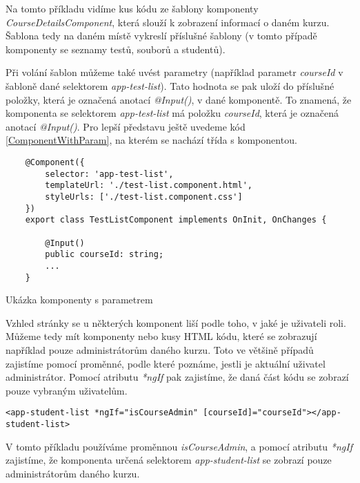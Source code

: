 Na tomto příkladu vidíme kus kódu ze šablony komponenty \textit{CourseDetailsComponent}, která slouží k zobrazení informací o daném kurzu. Šablona tedy na daném místě vykreslí příslušné šablony (v tomto případě komponenty se seznamy testů, souborů a studentů).

Při volání šablon můžeme také uvést parametry (například parametr \textit{courseId} v šabloně dané selektorem \textit{app-test-list}). Tato hodnota se pak uloží do příslušné položky, která je označená anotací \textit{@Input()}, v dané komponentě. To znamená, že komponenta se selektorem \textit{app-test-list} má položku \textit{courseId}, která je označená anotací \textit{@Input()}. Pro lepší představu ještě uvedeme kód \ref{ComponentWithParam}, na kterém se nachází třída s komponentou.

\lstset{style=typescript}

\begin{program}
	\begin{lstlisting}
	@Component({
		selector: 'app-test-list',
		templateUrl: './test-list.component.html',
		styleUrls: ['./test-list.component.css']
	})
	export class TestListComponent implements OnInit, OnChanges {
	
		@Input()
		public courseId: string;
		...
	}
	\end{lstlisting}
	\caption{Ukázka komponenty s parametrem}
	\label{ComponentWithParam}
\end{program}

\vspace{\baselineskip}

Vzhled stránky se u některých komponent liší podle toho, v jaké je uživateli roli. Můžeme tedy mít komponenty nebo kusy HTML kódu, které se zobrazují například pouze administrátorům daného kurzu.
Toto ve většině případů zajistíme pomocí proměnné, podle které poznáme, jestli je aktuální uživatel administrátor.
Pomocí atributu \textit{*ngIf} pak zajistíme, že daná část kódu se zobrazí pouze vybraným uživatelům.

\begin{lstlisting}
<app-student-list *ngIf="isCourseAdmin" [courseId]="courseId"></app-student-list>
\end{lstlisting}

V tomto příkladu používáme proměnnou \textit{isCourseAdmin}, a pomocí atributu \textit{*ngIf} zajistíme, že komponenta určená selektorem \textit{app-student-list} se zobrazí pouze administrátorům daného kurzu. 

\vspace{\baselineskip}

